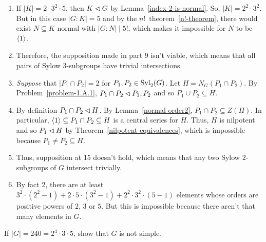 \begin{solution}
\begin{enumerate}[\rm1.]
    \item If $|K|=2\cdot3^2\cdot5$, then $K\lhd G$ by Lemma~\ref{index-2-is-normal}. So, $|K|=2^2\cdot3^2$. But in this case $|G:K|=5$ and by the $n!$~theorem~\ref{n!-theorem}, there would exist $N\subseteq K$ normal with $|G:N|\mid 5!$, which makes it impossible for $N$ to be $\langle1\rangle$.
    \item Therefore, the supposition made in part 9 isn't viable, which means that all pairs of Sylow $3$-subgroups have trivial intersections.
    \item {\it Suppose\/} that $|P_1\cap P_2|=2$ for $P_1,P_2\in{\rm Syl}_2(G)$. Let $H=N_G(P_1\cap P_2)$. By Problem~\ref{problem-1.A.1}, $P_1\cap P_2\lhd P_1,P_2$ and so $P_1\cup P_2\subseteq H$.
    \item By definition $P_1\cap P_2\lhd H$. By Lemma~\ref{normal-order2}, $P_1\cap P_2\subseteq Z(H)$. In particular, $\langle1\rangle\subseteq P_1\cap P_2\subseteq H$ is a central series for $H$. Thus, $H$ is nilpotent and so $P_1\lhd H$ by Theorem~\ref{nilpotent-equivalences}, which is impossible because $P_1\ne P_2\subseteq H$.
    \item Thus, supposition at 15 doesn't hold, which means that any two Sylow $2$-subgroups of $G$ intersect trivially.
    \item By fact 2, there are at least $3^2\cdot(2^2-1)+2\cdot5\cdot(3^2-1)+2^2\cdot3^2\cdot(5-1)$ elements whose orders are positive powers of $2$, $3$ or $5$. But this is impossible because there aren't that many elements in $G$.
\end{enumerate}
\end{solution}

\begin{probl}
    If\/ $|G|=240=2^4\cdot 3\cdot 5$, show that $G$ is not simple.
\end{probl}

